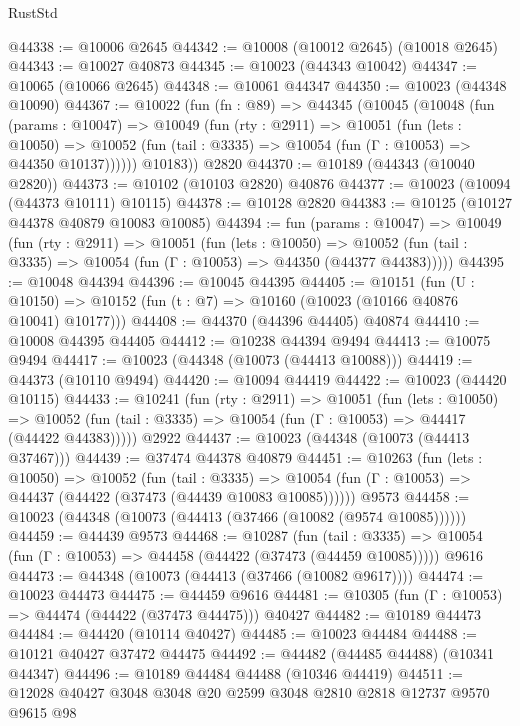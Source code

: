 \begin{lexlean}{RustStd}
\begin{coremodule}
@44338 := @10006 @2645
@44342 := @10008 (@10012 @2645) (@10018 @2645)
@44343 := @10027 @40873
@44345 := @10023 (@44343 @10042)
@44347 := @10065 (@10066 @2645)
@44348 := @10061 @44347
@44350 := @10023 (@44348 @10090)
@44367 := @10022
    (fun (fn : @89) =>
    @44345
      (@10045
        (@10048
          (fun (params : @10047) =>
          @10049
            (fun (rty : @2911) =>
            @10051
              (fun (lets : @10050) =>
              @10052 (fun (tail : @3335) => @10054 (fun (Γ : @10053) => @44350 @10137))))))
        @10183))
    @2820
@44370 := @10189 (@44343 (@10040 @2820))
@44373 := @10102 (@10103 @2820) @40876
@44377 := @10023 (@10094 (@44373 @10111) @10115)
@44378 := @10128 @2820
@44383 := @10125 (@10127 @44378 @40879 @10083 @10085)
@44394 := fun (params : @10047) =>
  @10049
    (fun (rty : @2911) =>
    @10051
      (fun (lets : @10050) =>
      @10052 (fun (tail : @3335) => @10054 (fun (Γ : @10053) => @44350 (@44377 @44383)))))
@44395 := @10048 @44394
@44396 := @10045 @44395
@44405 := @10151
    (fun (U : @10150) => @10152 (fun (t : @7) => @10160 (@10023 (@10166 @40876 @10041) @10177)))
@44408 := @44370 (@44396 @44405) @40874
@44410 := @10008 @44395 @44405
@44412 := @10238 @44394 @9494
@44413 := @10075 @9494
@44417 := @10023 (@44348 (@10073 (@44413 @10088)))
@44419 := @44373 (@10110 @9494)
@44420 := @10094 @44419
@44422 := @10023 (@44420 @10115)
@44433 := @10241
    (fun (rty : @2911) =>
    @10051
      (fun (lets : @10050) =>
      @10052 (fun (tail : @3335) => @10054 (fun (Γ : @10053) => @44417 (@44422 @44383)))))
    @2922
@44437 := @10023 (@44348 (@10073 (@44413 @37467)))
@44439 := @37474 @44378 @40879
@44451 := @10263
    (fun (lets : @10050) =>
    @10052
      (fun (tail : @3335) =>
      @10054 (fun (Γ : @10053) => @44437 (@44422 (@37473 (@44439 @10083 @10085))))))
    @9573
@44458 := @10023 (@44348 (@10073 (@44413 (@37466 (@10082 (@9574 @10085))))))
@44459 := @44439 @9573
@44468 := @10287
    (fun (tail : @3335) => @10054 (fun (Γ : @10053) => @44458 (@44422 (@37473 (@44459 @10085)))))
    @9616
@44473 := @44348 (@10073 (@44413 (@37466 (@10082 @9617))))
@44474 := @10023 @44473
@44475 := @44459 @9616
@44481 := @10305 (fun (Γ : @10053) => @44474 (@44422 (@37473 @44475))) @40427
@44482 := @10189 @44473
@44484 := @44420 (@10114 @40427)
@44485 := @10023 @44484
@44488 := @10121 @40427 @37472 @44475
@44492 := @44482 (@44485 @44488) (@10341 @44347)
@44496 := @10189 @44484 @44488 (@10346 @44419)
@44511 := @12028
    @40427
    @3048
    @3048
    @20
    @2599
    @3048
    @2810
    @2818
    @12737
    @9570
    @9615
    @98

\end{coremodule}
\end{lexlean}

